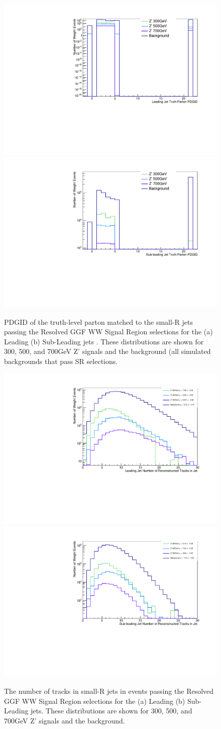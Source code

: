 \begin{figure}[h!]
  \centering
  \includegraphics[width=0.45\hsize]{figures/QGT/sigWJ1_pdgid_Pass_Res_GGF_WW_SR.pdf}
 \includegraphics[width=0.45\hsize]{figures/QGT/sigWJ2_pdgid_Pass_Res_GGF_WW_SR.pdf}
  \caption{PDGID of the truth-level parton matched to the small-R jets passing the Resolved GGF WW Signal Region selections for the (a) Leading (b) Sub-Leading jets . These distributions are shown for 300, 500, and 700GeV Z' signals and the background (all simulated backgrounds that pass SR selections.}
  \label{fig:diag_pdgid}
\end{figure}
\FloatBarrier



\begin{figure}[h!]
  \centering
  \includegraphics[width=0.45\hsize]{figures/QGT/sigWJ1_nTrk_Pass_Res_GGF_WW_SR.pdf}
 \includegraphics[width=0.45\hsize]{figures/QGT/sigWJ2_nTrk_Pass_Res_GGF_WW_SR.pdf}
  \caption{The number of tracks in small-R jets in events passing the Resolved GGF WW Signal Region selections for the (a) Leading (b) Sub-Leading jets. These distributions are shown for 300, 500, and 700GeV Z' signals and the background.}
  \label{fig:diag_ntrk}
\end{figure}
\FloatBarrier


